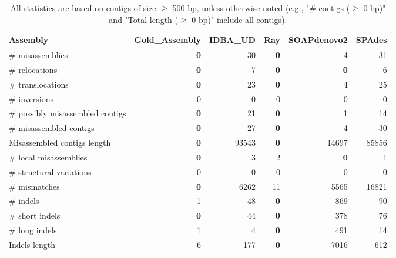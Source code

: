 \documentclass[12pt,a4paper]{article}
\begin{document}
\begin{table}[ht]
\begin{center}
\caption{All statistics are based on contigs of size $\geq$ 500 bp, unless otherwise noted (e.g., "\# contigs ($\geq$ 0 bp)" and "Total length ($\geq$ 0 bp)" include all contigs).}
\begin{tabular}{|l*{5}{|r}|}
\hline
Assembly & Gold\_Assembly & IDBA\_UD & Ray & SOAPdenovo2 & SPAdes \\ \hline
\# misassemblies & {\bf 0} & 30 & {\bf 0} & 4 & 31 \\ \hline
\hspace{5mm}\# relocations & {\bf 0} & 7 & {\bf 0} & {\bf 0} & 6 \\ \hline
\hspace{5mm}\# translocations & {\bf 0} & 23 & {\bf 0} & 4 & 25 \\ \hline
\hspace{5mm}\# inversions & 0 & 0 & 0 & 0 & 0 \\ \hline
\# possibly misassembled contigs & {\bf 0} & 21 & {\bf 0} & 1 & 14 \\ \hline
\# misassembled contigs & {\bf 0} & 27 & {\bf 0} & 4 & 30 \\ \hline
Misassembled contigs length & {\bf 0} & 93543 & {\bf 0} & 14697 & 85856 \\ \hline
\# local misassemblies & {\bf 0} & 3 & 2 & {\bf 0} & 1 \\ \hline
\# structural variations & 0 & 0 & 0 & 0 & 0 \\ \hline
\# mismatches & {\bf 0} & 6262 & 11 & 5565 & 16821 \\ \hline
\# indels & 1 & 48 & {\bf 0} & 869 & 90 \\ \hline
\hspace{5mm}\# short indels & {\bf 0} & 44 & {\bf 0} & 378 & 76 \\ \hline
\hspace{5mm}\# long indels & 1 & 4 & {\bf 0} & 491 & 14 \\ \hline
Indels length & 6 & 177 & {\bf 0} & 7016 & 612 \\ \hline
\end{tabular}
\end{center}
\end{table}
\end{document}
